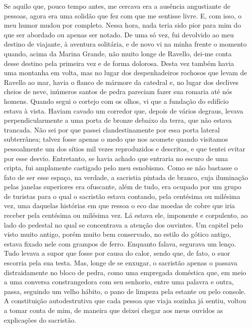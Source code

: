 Se aquilo que, pouco tempo antes, me cercava era a ausência angustiante
de pessoas, agora era uma solidão que fez com que me sentisse livre. E,
com isso, o meu humor mudou por completo. Nessa hora, nada teria sido
pior para mim do que ser abordado ou apenas ser notado. De uma só vez,
fui devolvido ao meu destino de viajante, à aventura solitária, e de
novo vi na minha frente o momento quando, acima da Marina Grande, não
muito longe de Ravello, dei-me conta desse destino pela primeira vez e
de forma dolorosa. Desta vez também havia uma montanha em volta, mas no
lugar dos despenhadeiros rochosos que levam de Ravello ao mar, havia o
flanco de mármore da catedral e, no lugar dos declives cheios de neve,
inúmeros santos de pedra pareciam fazer sua romaria até nós homens.
Quando segui o cortejo com os olhos, vi que a fundação do edifício
estava à vista. Haviam cavado um corredor que, depois de vários degraus,
levava perpendicularmente a uma porta de bronze debaixo da terra, que
não estava trancada. Não sei por que passei clandestinamente por essa
porta lateral subterrânea; talvez fosse apenas o medo que nos acomete
quando visitamos pessoalmente um dos sítios mil vezes reproduzidos e
descritos, e que tentei evitar por esse desvio. Entretanto, se havia
achado que entraria no escuro de uma cripta, fui amplamente castigado
pelo meu esnobismo. Como se não bastasse o fato de ser esse espaço, na
verdade, a sacristia pintada de branco, cuja iluminação pelas janelas
superiores era ofuscante, além de tudo, era ocupado por um grupo de
turistas para o qual o sacristão estava contando, pela centésima ou
milésima vez, uma daquelas histórias em que ressoa o eco das moedas de
cobre que iria receber pela centésima ou milésima vez. Lá estava ele,
imponente e corpulento, ao lado do pedestal no qual se concentrava a
atenção dos ouvintes. Um capitel pelo visto muito antigo, porém muito
bem conservado, no estilo do gótico antigo, estava fixado nele com
grampos de ferro. Enquanto falava, segurava um lenço. Tudo levava a
supor que fosse por causa do calor, sendo que, de fato, o suor escorria
pela sua testa. Mas, longe de se enxugar, o sacristão apenas o passava
distraidamente no bloco de pedra, como uma empregada doméstica que, em
meio a uma conversa constrangedora com seu senhorio, entre uma palavra e
outra, passa, seguindo um velho hábito, o pano de limpeza pela estante
ou pelo console. A constituição autodestrutiva que cada pessoa que viaja
sozinha já sentiu, voltou a tomar conta de mim, de maneira que deixei
chegar aos meus ouvidos as explicações do sacristão.

